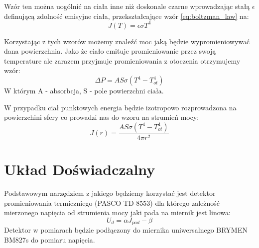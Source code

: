 \documentclass[12pt]{article}
\begin{document}
Wzór ten można uogólnić na ciała inne niż doskonale czarne wprowadzając stałą $\epsilon$ definującą zdolność emisyjne ciała, przekształcające wzór \ref{eq:boltzman_law} na:
\begin{equation}
    J(T) = \epsilon \sigma T^4
    \label{eq:boltzman_law_epsilon}
\end{equation}

Korzystając z tych wzorów możemy znaleźć moc jaką będzie wypromieniowywać dana powierzchnia. Jako że ciało emituje promieniowanie przez swoją temperature ale zarazem przyjmuje promieniowania z otoczenia otrzymujemy wzór:
\begin{equation}
    \Delta P = AS \sigma (T^4-T^4_{ot})
    \label{eq:power_loss}
\end{equation}
W którym A - absorbcja, S - pole powierzchni ciała. 

W przypadku ciał punktowych energia będzie izotropowo rozprowadzona na powierzchini sfery co prowadzi nas do wzoru na strumień mocy:
\begin{equation}
    J(r) = \frac{AS \sigma (T^4-T^4_{ot})}{4\pi r^2}
    \label{eq:power_flux}
\end{equation}

\section{Układ Doświadczalny}
Podstawowym narzędziem z jakiego będziemy korzystać jest detektor promieniowania termiczniego (PASCO TD-8553) dla którego zależność mierzonego napięcia od strumienia mocy jaki pada na miernik jest linowa:
\begin{equation}
    U_d = \alpha J_{pad}-\beta
    \label{eq:measurment_device}
\end{equation}
Detektor w pomiarach będzie podłączony do miernika uniwersalnego BRYMEN BM827s do pomiaru napięcia.
\end{document}
